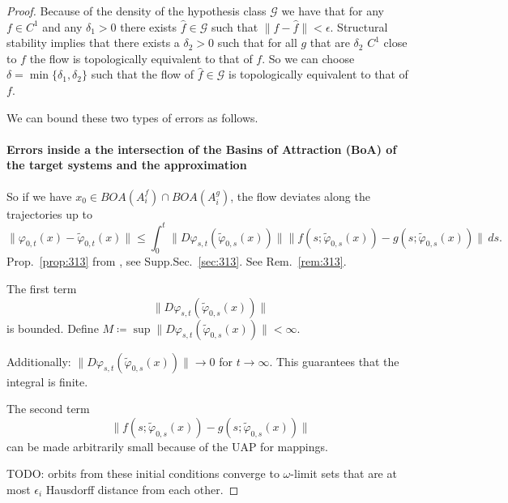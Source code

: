 \documentclass{article}
\theoremstyle{definition}
\theoremstyle{remark}
\newcounter{ct}
\begin{document}
\begin{proof}
Because of the density of the hypothesis class $\mathcal{G}$ we have that for any $f\in C^1$ and any $\delta_1>0$
there exists $\hat f\in\mathcal{G}$ such that $\|f-\hat f\|<\epsilon$.
%
Structural stability implies that there exists a $\delta_2>0$ such that for all $g$ that are $\delta_2$ $C^1$ close to $f$ the flow is topologically equivalent to that of $f$.
%
So we can choose $\delta = \min\{\delta_1,\delta_2\}$ such that the flow of $\hat f\in\mathcal{G}$ is topologically equivalent to that of $f$.


We can bound these two types of errors as follows.%

\paragraph{Errors inside a the intersection of the Basins of Attraction (BoA) of the target systems and the approximation}
So if we have $x_0\in BOA(A_i^f) \cap BOA(A_i^g)$, the flow deviates along the trajectories up to 
\[
\|\varphi_{0,t}(x) - \tilde{\varphi}_{0,t}(x)\| \leq \int_0^t \|D\varphi_{s,t}(\tilde{\varphi}_{0,s}(x))\| \|f(s; \tilde{\varphi}_{0,s}(x)) - g(s; \tilde{\varphi}_{0,s}(x))\| \, ds.
\]
Prop.~\ref{prop:313} from \citep{vanhandel2007filtering}, see Supp.Sec.~\ref{sec:313}.
%
See Rem.~\ref{rem:313}.

The first term \[\|D\varphi_{s,t}(\tilde{\varphi}_{0,s}(x))\|\]
is bounded. %
Define $M\coloneqq \sup \|D\varphi_{s,t}(\tilde{\varphi}_{0,s}(x))\|<\infty$. 

Additionally:
\(\|D\varphi_{s,t}(\tilde{\varphi}_{0,s}(x))\|\rightarrow 0\) for \(t\rightarrow\infty\).
%
This guarantees that the integral is finite.

The second term
\[\|f(s; \tilde{\varphi}_{0,s}(x)) - g(s; \tilde{\varphi}_{0,s}(x))\|\]
can be made arbitrarily small because of the UAP for mappings.


TODO:
orbits from these initial conditions converge to $\omega$-limit sets that are at most $\epsilon_i$ Hausdorff distance from each other.



\end{proof}
\end{document}

